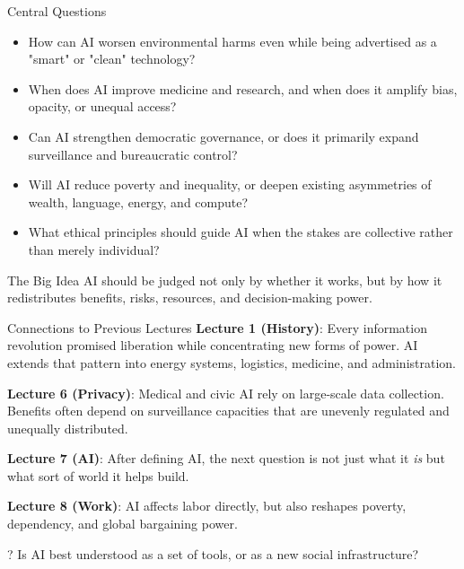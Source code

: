 \documentclass[aspectratio=169,11pt]{beamer}
\begin{document}
\begin{frame}{Central Questions}
\begin{itemize}
    \item How can AI worsen environmental harms even while being advertised as a "smart" or "clean" technology?
    \item When does AI improve medicine and research, and when does it amplify bias, opacity, or unequal access?
    \item Can AI strengthen democratic governance, or does it primarily expand surveillance and bureaucratic control?
    \item Will AI reduce poverty and inequality, or deepen existing asymmetries of wealth, language, energy, and compute?
    \item What ethical principles should guide AI when the stakes are collective rather than merely individual?
\end{itemize}

\vspace{0.2cm}
\begin{alertblock}{The Big Idea}
AI should be judged not only by whether it works, but by how it redistributes benefits, risks, resources, and decision-making power.
\end{alertblock}
\end{frame}

\begin{frame}{Connections to Previous Lectures}
\textbf{Lecture 1 (History)}: Every information revolution promised liberation while concentrating new forms of power. AI extends that pattern into energy systems, logistics, medicine, and administration.

\vspace{0.2cm}
\textbf{Lecture 6 (Privacy)}: Medical and civic AI rely on large-scale data collection. Benefits often depend on surveillance capacities that are unevenly regulated and unequally distributed.

\vspace{0.2cm}
\textbf{Lecture 7 (AI)}: After defining AI, the next question is not just what it \emph{is} but what sort of world it helps build.

\vspace{0.2cm}
\textbf{Lecture 8 (Work)}: AI affects labor directly, but also reshapes poverty, dependency, and global bargaining power.

\begin{alertblock}{?}
Is AI best understood as a set of tools, or as a new social infrastructure?
\end{alertblock}
\end{frame}
\end{document}
